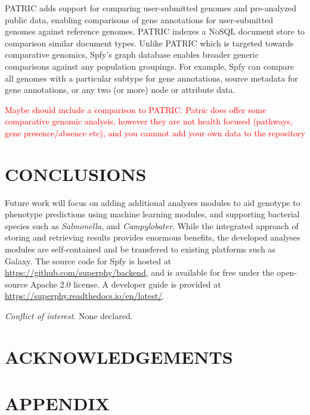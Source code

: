 \documentclass{article}
\newcommand\mwcomment[1]{\textcolor{red}{#1}}
\begin{document}
PATRIC \cite{wattam2016improvements} adds support for comparing user-submitted genomes and pre-analyzed public data, enabling comparisons of gene annotations for user-submitted genomes against reference genomes. PATRIC indexes a NoSQL document store to comparison similar document types. Unlike PATRIC which is targeted towards comparative genomics, Spfy's graph database enables broader generic comparisons against any population groupings. For example, Spfy can compare all genomes with a particular subtype for gene annotations, source metadata for gene annotations, or any two (or more) node or attribute data.

\small 

\mwcomment{Maybe should include a comparison to PATRIC. Patric does offer some comparative genomic analysis, however they are not health focused (pathways, gene presence/absence etc), and you cannnot add your own data to the repository}

\section{CONCLUSIONS}

Future work will focus on adding additional analyses modules to aid genotype to phenotype predictions using machine learning modules, and supporting bacterial species such as \textit{Salmonella}, and \textit{Campylobater}. While the integrated approach of storing and retrieving results provides enormous benefits, the developed analyses modules are self-contained and be transfered to existing platforms such as Galaxy. The source code for Spfy is hosted at \url{https://github.com/superphy/backend}, and is available for free under the open-source Apache 2.0 license. A developer guide is provided at \url{https://superphy.readthedocs.io/en/latest/}.

\textit{Conflict of interest}. None declared.

\section{ACKNOWLEDGEMENTS}

\newpage




\newpage

\section{APPENDIX}
\end{document}
